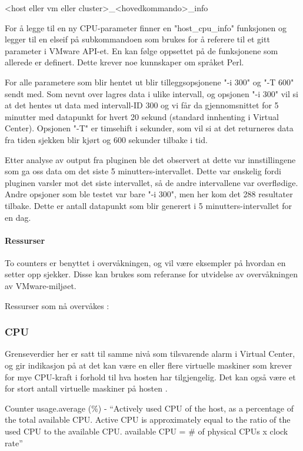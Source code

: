 <host eller vm eller cluster>\_<hovedkommando>\_info

For å legge til en ny CPU-parameter finner en "host\_cpu\_info"  funksjonen og legger til en elseif på subkommandoen som brukes for å referere til et gitt parameter i VMware API-et. En kan følge oppsettet på de funksjonene som allerede er definert. Dette krever noe kunnskaper om språket Perl.

For alle parametere som blir hentet ut blir tilleggsopsjonene "-i 300" og "-T 600" sendt med. Som nevnt over lagres data i ulike intervall, og opsjonen "-i 300"  vil si at det hentes ut data med intervall-ID 300 og vi får da gjennomsnittet for 5 minutter med datapunkt for hvert 20 sekund (standard innhenting i Virtual Center). Opsjonen "-T"  er timsehift i sekunder, som vil si at det returneres data fra tiden sjekken blir kjørt og 600 sekunder tilbake i tid.

Etter analyse av output fra pluginen ble det observert at dette var innstillingene som ga oss data om det siste 5 minutters-intervallet. Dette var ønskelig fordi pluginen varsler mot det siste intervallet, så de andre intervallene var overflødige. Andre opsjoner som ble testet var bare "-i 300", men her kom det 288 resultater tilbake. Dette er antall datapunkt som blir generert i 5 minutters-intervallet for en dag. \cite{vmwareperfintervals}

\paragraph{Ressurser}

To counters er benyttet i overvåkningen, og vil være eksempler på hvordan en setter opp sjekker. Disse kan brukes som referanse for utvidelse av overvåkningen av VMware-miljøet.

Ressurser som nå overvåkes \cite{ciscovirtual} \cite{vmwaremonitoring}:

\subsubsection*{CPU}

Grenseverdier her er satt til samme nivå som tilsvarende alarm i Virtual Center, og gir indikasjon på at det kan være en eller flere virtuelle maskiner som krever for mye CPU-kraft i forhold til hva hosten har tilgjengelig. Det kan også være et for stort antall virtuelle maskiner på hosten \cite{vmwarecounters}.

Counter usage.average (\%) - ``Actively used CPU of the host, as a percentage of the total available CPU. Active CPU is approximately equal to the ratio of the used CPU to the available CPU. available CPU = \# of physical CPUs x clock rate''

